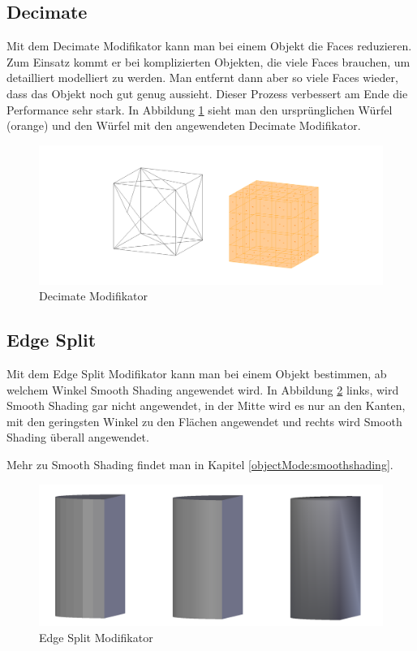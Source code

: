 \subsection{Decimate}\citep{blender:decimate_modifier}
Mit dem Decimate Modifikator kann man bei einem Objekt die Faces reduzieren. Zum Einsatz kommt er bei komplizierten
Objekten, die viele Faces brauchen, um detailliert modelliert zu werden. Man entfernt dann aber so viele Faces
wieder, dass das Objekt noch gut genug aussieht. Dieser Prozess verbessert am Ende die Performance sehr stark.
In Abbildung \ref{modifikatoren:image6} sieht man den ursprünglichen Würfel (orange) und den Würfel mit den angewendeten
Decimate Modifikator.
\begin{figure}[h]
    \centering
    \includegraphics[width=.8\textwidth]{images/Modifikatoren-Decimate.png}
    \caption{Decimate Modifikator}
    \label{modifikatoren:image6}
\end{figure}

\subsection{Edge Split}\citep{blender:edgesplit_modifier}
Mit dem Edge Split Modifikator kann man bei einem Objekt bestimmen, ab welchem Winkel Smooth Shading angewendet wird.
In Abbildung \ref{modifikatoren:image7} links, wird Smooth Shading gar nicht angewendet, in der Mitte wird es nur an
den Kanten, mit den geringsten Winkel zu den Flächen angewendet und rechts wird Smooth Shading überall angewendet.

Mehr zu Smooth Shading findet man in Kapitel \ref{objectMode:smoothshading}.
\begin{figure}[h]
    \centering
    \includegraphics[width=.8\textwidth]{images/Modifikatoren-Edgesplit.png}
    \caption{Edge Split Modifikator}
    \label{modifikatoren:image7}
\end{figure}